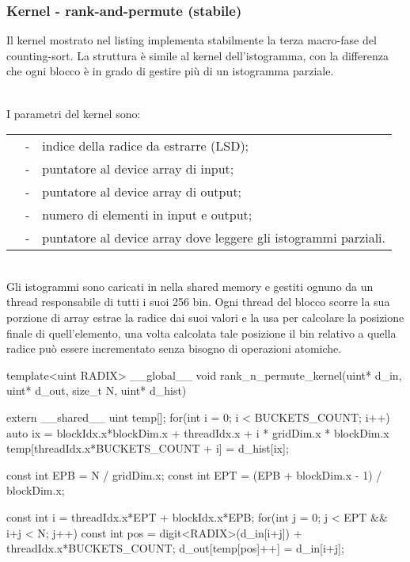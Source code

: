 \subsubsection{Kernel - {rank-and-permute} (stabile)}
Il kernel  mostrato nel listing  implementa stabilmente la terza macro-fase del counting-sort. La struttura è simile al kernel dell'istogramma, con la differenza che ogni blocco è in grado di gestire più di un istogramma parziale.

\medskip
\noindent
\textbf{\color{black!65!white}\small{}}\\
I parametri del kernel sono:

\begin{compactcenter}
	\begin{tabular}{rcp{6.5cm}}
		\cppinline{uint RADIX} &-& indice della radice da estrarre (LSD); \\
		\cppinline{uint *d_in} &-& puntatore al device array di input; \\
		\cppinline{uint *d_out} &-& puntatore al device array di output; \\
		\cppinline{size_t N}  &-& numero di elementi in input e output; \\
		\cppinline{uint *d_hist} &-& puntatore al device array dove leggere gli istogrammi parziali.
	\end{tabular}
\end{compactcenter}

\noindent
\textbf{\color{black!65!white}\small{}}\\
Gli istogrammi sono caricati in nella shared memory e gestiti ognuno da un thread responsabile di tutti i suoi 256 bin. Ogni thread del blocco scorre la sua porzione di array estrae la radice dai suoi valori e la usa per calcolare la posizione finale di quell'elemento, una volta calcolata tale posizione il bin relativo a quella radice può essere incrementato senza bisogno di operazioni atomiche.

\begin{cpp}[caption={%
		Estratto del codice della procedura partial di ordinamento.
		\texttt{RADIX\_SIZE} è $b$. 
	},%
	label={rank-and-permute-code}, captionpos=t]
template<uint RADIX> __global__ 
void rank_n_permute_kernel(uint* d_in, uint* d_out, size_t N, 
                           uint* d_hist){
	extern __shared__ uint temp[];
	for(int i = 0; i < BUCKETS_COUNT; i++){
		auto ix = blockIdx.x*blockDim.x + threadIdx.x +
		          i * gridDim.x * blockDim.x
		temp[threadIdx.x*BUCKETS_COUNT + i] = d_hist[ix];
	}
	
	const int EPB = N / gridDim.x;
	const int EPT = (EPB + blockDim.x - 1) / blockDim.x;
	
	const int i = threadIdx.x*EPT + blockIdx.x*EPB;
	for(int j = 0; j < EPT && i+j < N; j++){
		const int pos =  digit<RADIX>(d_in[i+j]) + 
		                 threadIdx.x*BUCKETS_COUNT;
		d_out[temp[pos]++] = d_in[i+j];
	}
}
\end{cpp}


